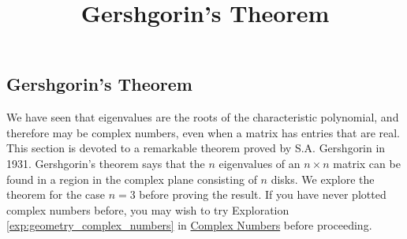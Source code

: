 \documentclass{ximera}
\title{Gershgorin's Theorem} \license{CC BY-NC-SA 4.0}
\begin{document}
\begin{abstract}
\end{abstract}
\maketitle

\begin{onlineOnly}
\section*{Gershgorin's Theorem}
\end{onlineOnly}

We have seen that eigenvalues are the roots of the characteristic polynomial, and therefore may be complex numbers, even when a matrix has entries that are real.  This section is devoted to a remarkable theorem proved by S.A. Gershgorin in 1931. Gershgorin's theorem says that the $n$ eigenvalues of an $n \times n$ matrix can be found in a region in the complex plane consisting of $n$ disks.  We explore the theorem for the case $n=3$ before proving the result.  If you have never plotted complex numbers before, you may wish to try Exploration \ref{exp:geometry_complex_numbers} in \href{https://ximera.osu.edu/linearalgebradzv3/LinearAlgebraInteractiveIntro/APX-0020/main}{Complex Numbers} before proceeding.
\end{document}
